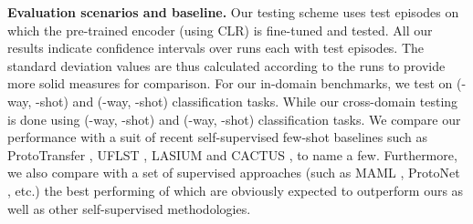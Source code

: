 \documentclass{article}
\newcommand{\ccclr}{CLR}
\begin{document}
\textbf{Evaluation scenarios and baseline.} Our testing scheme uses  test episodes on which the pre-trained encoder (using \ccclr) is fine-tuned and tested. All our results indicate  confidence intervals over  runs each with  test episodes. The standard deviation values are thus calculated according to the  runs to provide more solid measures for comparison. For our in-domain benchmarks, we test on (-way, -shot) and (-way, -shot) classification tasks. While our cross-domain testing is done using (-way, -shot) and (-way, -shot) classification tasks. We compare our performance with a suit of recent self-supervised few-shot baselines such as ProtoTransfer \citep{Medina2020Self-SupervisedClassification}, UFLST \citep{Ji2019UnsupervisedTraining}, LASIUM \citep{Khodadadeh2020UnsupervisedModels} and CACTUS \citep{Hsu2018UnsupervisedMeta-Learning}, to name a few. Furthermore, we also compare with a set of supervised approaches (such as MAML \citep{Finn2017Model-agnosticNetworks}, ProtoNet \citep{Snell2017PrototypicalLearning} , etc.) the best performing of which are obviously expected to outperform ours as well as other self-supervised methodologies.
\end{document}
